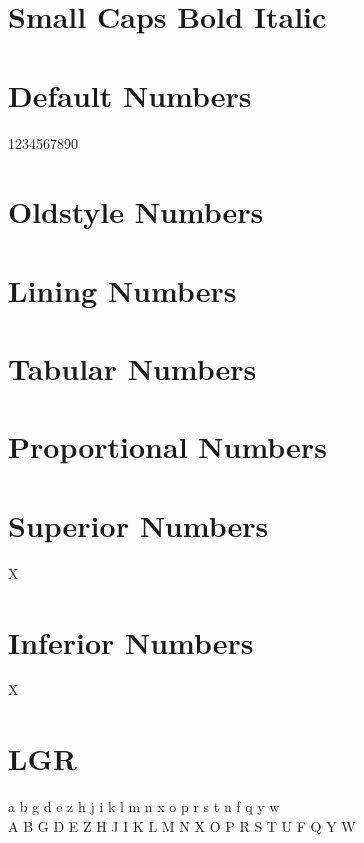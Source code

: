 \documentclass{article}
\begin{document}
\section*{Small Caps Bold Italic}
\textbf{\textsc{\textit{\lipsum[6]}}}

\section*{Default Numbers}

1234567890

\section*{Oldstyle Numbers}


\section*{Lining Numbers}


\section*{Tabular Numbers}


\section*{Proportional Numbers}



\section*{Superior Numbers}

X

\section*{Inferior Numbers}

X

\section*{LGR}

{\junicodelgr\noindent
 a b g d e z h j i k l m n x o p r s t u f q y w\\
 A B G D E Z H J I K L M N X O P R S T U F Q Y W\\
}
\end{document}
